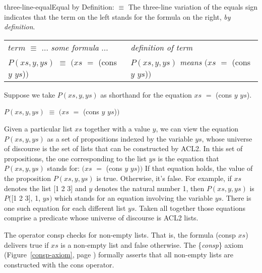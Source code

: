 \begin{aside}{three-line-equal}{Equal by Definition: $\equiv$}
The
three-line
variation of the equals sign
indicates that the term on the left stands
for the formula on the right, \emph{by definition}.
\begin{center}
\addtolength{\tabcolsep}{-2pt}
\begin{tabular}{ll}
$term$ $\equiv$ $\dots$ \emph{some formula} $\dots$    &\emph{definition of term} \\
$P(xs, y, ys)$ $\equiv$ $(xs$ $=$ \textsf{(cons $y$ $ys$)}$)$ &$P(xs, y, ys)$ \emph{means} $(xs$ $=$ \textsf{(cons $y$ $ys$)}$)$  \\
\end{tabular}
\addtolength{\tabcolsep}{2pt}
\end{center}
\end{aside}

Suppose we take $P(xs, y, ys)$ as shorthand
for the equation $xs$ $=$ \textsf{(cons $y$ $ys$)}.
\begin{center}
$P(xs, y, ys)$ $\equiv$ $(xs$ $=$ \textsf{(cons $y$ $ys$)}$)$
\end{center}

Given a particular list $xs$ together with a value $y$,
we can view the equation $P(xs, y, ys)$ as a set of propositions
indexed by the variable $ys$, whose universe of discourse is the set of
lists that can be constructed by ACL2.
In this set of propositions, the one corresponding to
the list $ys$ is the equation that $P(xs, y, ys)$ stands for:
$(xs$ $=$ \textsf{(cons $y$ $ys$)}$)$
If that equation holds, the value of the proposition $P(xs, y, ys)$ is true.
Otherwise, it's false.
For example, if $xs$ denotes the list \textsf{[1 2 3]}
and $y$ denotes the natural number 1,
then $P(xs, y, ys)$ is $P($\textsf{[1 2 3]}, \textsf{1}, $ys)$
which stands for an equation involving the variable $ys$.
There is one such equation for each different list $ys$.
Taken all together those equations comprise a predicate
whose universe of discourse is ACL2 lists.

The operator 
\textsf{consp}
checks for non-empty lists.
That is, the formula \textsf{(consp $xs$)} delivers true
if $xs$ is a non-empty list and false otherwise.
The \{\emph{consp}\} axiom
(Figure~\ref{consp-axiom}, page \pageref{consp-axiom})
formally asserts that all non-empty lists
are constructed with the \textsf{cons} operator.

